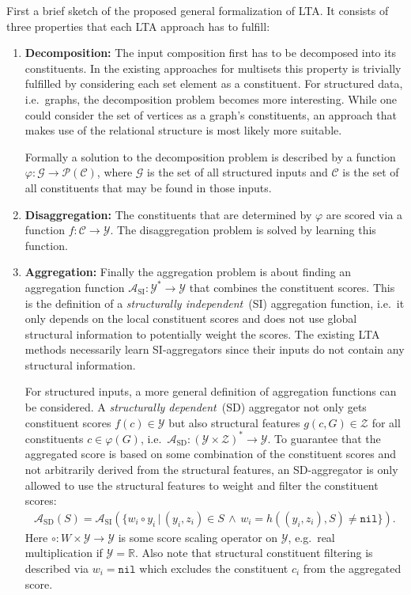 \documentclass[12pt]{scrartcl}
\begin{document}
First a brief sketch of the proposed general formalization of LTA.\@
It consists of three properties that each LTA approach has to fulfill:
\begin{enumerate}[label=\textbf{\arabic*.}]
	\item \textbf{Decomposition:}
		The input composition first has to be decomposed into its constituents.
		In the existing approaches for multisets this property is trivially fulfilled by considering each set element as a constituent.
		For structured data, i.e.\ graphs, the decomposition problem becomes more interesting.
		While one could consider the set of vertices as a graph's constituents, an approach that makes use of the relational structure is most likely more suitable.

		Formally a solution to the decomposition problem is described by a function $\varphi: \mathcal{G} \to \mathcal{P}(\mathcal{C})$, where $\mathcal{G}$ is the set of all structured inputs and $\mathcal{C}$ is the set of all constituents that may be found in those inputs.
	\item \textbf{Disaggregation:}
		The constituents that are determined by $\varphi$ are scored via a function $f: \mathcal{C} \to \mathcal{Y}$.
		The disaggregation problem is solved by learning this function.
	\item \textbf{Aggregation:}
		Finally the aggregation problem is about finding an aggregation function $\mathcal{A}_{\text{SI}}: \mathcal{Y}^* \to \mathcal{Y}$ that combines the constituent scores.
		This is the definition of a \textit{structurally independent}~(SI) aggregation function, i.e.\ it only depends on the local constituent scores and does not use global structural information to potentially weight the scores.
		The existing LTA methods necessarily learn SI-aggregators since their inputs do not contain any structural information.

		For structured inputs, a more general definition of aggregation functions can be considered.
		A \textit{structurally dependent}~(SD) aggregator not only gets constituent scores $f(c) \in \mathcal{Y}$ but also structural features $g(c, G) \in \mathcal{Z}$ for all constituents $c \in \varphi(G)$, i.e.\ $\mathcal{A}_{\text{SD}}: {(\mathcal{Y} \times \mathcal{Z})}^* \to \mathcal{Y}$.
		To guarantee that the aggregated score is based on some combination of the constituent scores and not arbitrarily derived from the structural features, an SD-aggregator is only allowed to use the structural features to weight and filter the constituent scores:
		\begin{align}
			\mathcal{A}_{\text{SD}}(S)
			= \mathcal{A}_{\text{SI}}(\{ w_i \circ y_i \,|\, (y_i, z_i) \in S \,\land\, w_i = h((y_i, z_i), S) \neq \texttt{nil} \}) \text{.} %
		\end{align}
		Here $\circ: W \times \mathcal{Y} \to \mathcal{Y}$ is some score scaling operator on $\mathcal{Y}$, e.g.\ real multiplication if $\mathcal{Y} = \mathbb{R}$.
		Also note that structural constituent filtering is described via $w_i = \texttt{nil}$ which excludes the constituent $c_i$ from the aggregated score.
\end{enumerate}
\end{document}
